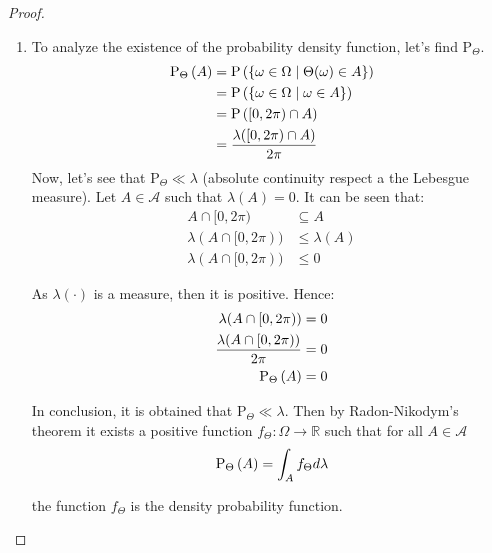 \documentclass[11pt]{article}
\theoremstyle{definition}
\theoremstyle{remark}
\theoremstyle{remark}
\newcommand{\R}{{\mathbb{R}}}
\begin{document}
\begin{proof}
\begin{enumerate}[label=\alph*)]
    \item To analyze the existence of the probability density
      function, let's find $\mathrm{P}_\Theta$.
      \begin{align*}
        \P[\Theta]{A} &= \P{\{\omega \in \Omega \mid \Theta(\omega) \in A\}} \\
                      &= \P{\{\omega \in \Omega \mid \omega \in A\}} \\
                      &= \P{[0, 2\pi)\cap A} \\
                      &= \frac{\lambda([0, 2\pi)\cap A)}{2\pi}
      \end{align*}
      Now, let's see that $\mathrm{P}_\Theta \ll \lambda$ (absolute
      continuity respect a the Lebesgue measure). Let
      $A \in \mathcal{A}$ such that $\lambda(A) = 0$. It can be seen
      that:
      \begin{align*}
        A \cap [0, 2\pi) &\subseteq A \\
        \lambda(A \cap [0, 2\pi)) &\le \lambda(A) \\
        \lambda(A \cap [0, 2\pi)) &\le 0
      \end{align*}

      As $\lambda(\cdot)$ is a measure, then it is positive. Hence:
      \begin{align*}
        \lambda(A \cap [0, 2\pi)) &= 0 \\
        \frac{\lambda(A \cap [0, 2\pi))}{2\pi} &= 0 \\
        \P[\Theta]{A} &= 0
      \end{align*}

      In conclusion, it is obtained that
      $\mathrm{P}_\Theta \ll \lambda$. Then by Radon-Nikodym's theorem
      it exists a positive function $f_\Theta : \Omega \rightarrow \R$
      such that for all $A \in \mathcal{A}$
      \begin{equation*}
        \P[\Theta]{A} = \int_A f_\Theta d\lambda
      \end{equation*}

      the function $f_\Theta$ is the density probability function.
  \end{enumerate}
\end{proof}
\end{document}
